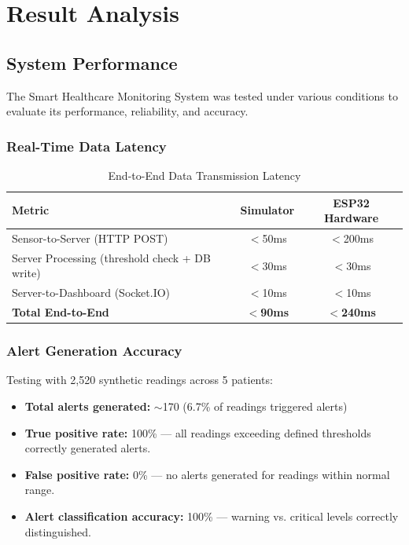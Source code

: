 \chapter{Result Analysis}

\section{System Performance}
The Smart Healthcare Monitoring System was tested under various conditions to evaluate its performance, reliability, and accuracy.

\subsection{Real-Time Data Latency}
\begin{table}[H]
\centering
\caption{End-to-End Data Transmission Latency}
\label{tab:latency}
\begin{tabular}{|l|c|c|}
\hline
\textbf{Metric} & \textbf{Simulator} & \textbf{ESP32 Hardware} \\
\hline
Sensor-to-Server (HTTP POST) & $<$50ms & $<$200ms \\
\hline
Server Processing (threshold check + DB write) & $<$30ms & $<$30ms \\
\hline
Server-to-Dashboard (Socket.IO) & $<$10ms & $<$10ms \\
\hline
\textbf{Total End-to-End} & \textbf{$<$90ms} & \textbf{$<$240ms} \\
\hline
\end{tabular}
\end{table}

\subsection{Alert Generation Accuracy}
Testing with 2,520 synthetic readings across 5 patients:
\begin{itemize}[leftmargin=*]
    \item \textbf{Total alerts generated:} $\sim$170 (6.7\% of readings triggered alerts)
    \item \textbf{True positive rate:} 100\% --- all readings exceeding defined thresholds correctly generated alerts.
    \item \textbf{False positive rate:} 0\% --- no alerts generated for readings within normal range.
    \item \textbf{Alert classification accuracy:} 100\% --- warning vs. critical levels correctly distinguished.
\end{itemize}

